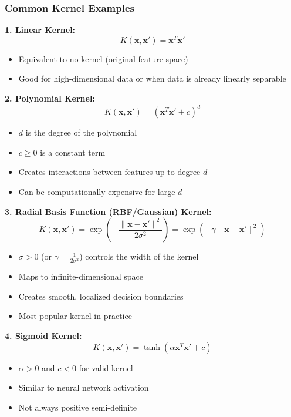 \documentclass[12pt,a4paper]{article}
\begin{document}
\subsubsection{Common Kernel Examples}

\textbf{1. Linear Kernel:}
\begin{equation}
K(\mathbf{x}, \mathbf{x}') = \mathbf{x}^T\mathbf{x}'
\end{equation}
\begin{itemize}
    \item Equivalent to no kernel (original feature space)
    \item Good for high-dimensional data or when data is already linearly separable
\end{itemize}

\textbf{2. Polynomial Kernel:}
\begin{equation}
K(\mathbf{x}, \mathbf{x}') = (\mathbf{x}^T\mathbf{x}' + c)^d
\end{equation}
\begin{itemize}
    \item $d$ is the degree of the polynomial
    \item $c \geq 0$ is a constant term
    \item Creates interactions between features up to degree $d$
    \item Can be computationally expensive for large $d$
\end{itemize}

\textbf{3. Radial Basis Function (RBF/Gaussian) Kernel:}
\begin{equation}
K(\mathbf{x}, \mathbf{x}') = \exp\left(-\frac{\|\mathbf{x} - \mathbf{x}'\|^2}{2\sigma^2}\right) = \exp(-\gamma \|\mathbf{x} - \mathbf{x}'\|^2)
\end{equation}
\begin{itemize}
    \item $\sigma > 0$ (or $\gamma = \frac{1}{2\sigma^2}$) controls the width of the kernel
    \item Maps to infinite-dimensional space
    \item Creates smooth, localized decision boundaries
    \item Most popular kernel in practice
\end{itemize}

\textbf{4. Sigmoid Kernel:}
\begin{equation}
K(\mathbf{x}, \mathbf{x}') = \tanh(\alpha \mathbf{x}^T\mathbf{x}' + c)
\end{equation}
\begin{itemize}
    \item $\alpha > 0$ and $c < 0$ for valid kernel
    \item Similar to neural network activation
    \item Not always positive semi-definite
\end{itemize}
\end{document}
